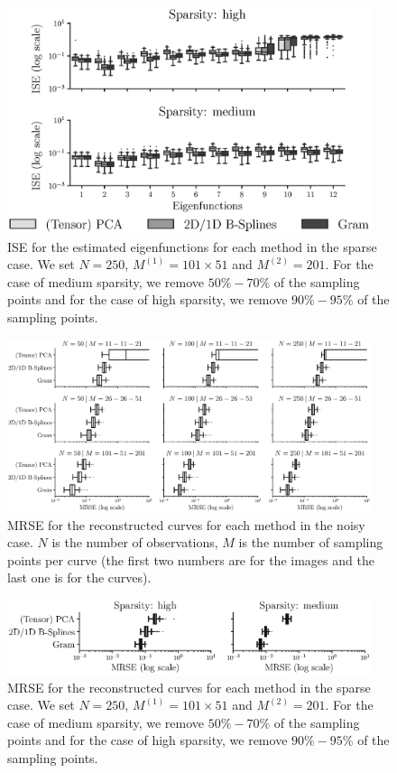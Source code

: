 \begin{figure}
     \centering
    \includegraphics[width=0.95\textwidth]{ISE_sparse}
    \caption{ISE for the estimated eigenfunctions for each method in the sparse case. We set $N = 250$, $M^{(1)} = 101 \times 51$ and $M^{(2)} = 201$. For the case of medium sparsity, we remove $50\%-70\%$ of the sampling points and for the case of high sparsity, we remove $90\%-95\%$ of the sampling points.}
    \label{fig:ise_mfd_1d_sparse}
\end{figure}


\begin{figure}
     \centering
     \includegraphics[width=0.95\textwidth]{MRSE_noise}
    \caption{MRSE for the reconstructed curves for each method in the noisy case. $N$ is the number of observations, $M$ is the number of sampling points per curve (the first two numbers are for the images and the last one is for the curves).}
    \label{fig:mise_mfd_1d_noise}
\end{figure}

\begin{figure}
     \centering
     \includegraphics[width=0.95\textwidth]{MRSE_sparse}
    \caption{MRSE for the reconstructed curves for each method in the sparse case. We set $N = 250$, $M^{(1)} = 101 \times 51$ and $M^{(2)} = 201$. For the case of medium sparsity, we remove $50\%-70\%$ of the sampling points and for the case of high sparsity, we remove $90\%-95\%$ of the sampling points.}
    \label{fig:mise_mfd_1d_sparse}
\end{figure}


